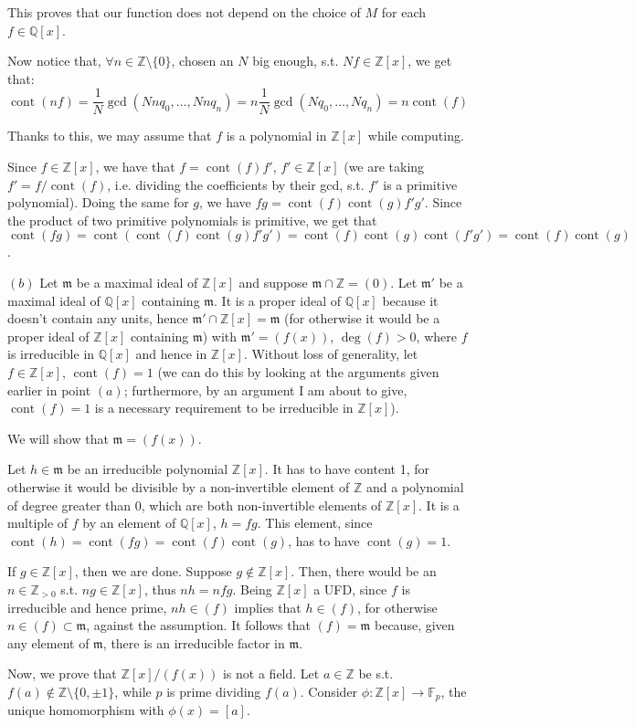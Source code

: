 \documentclass{article}
\newcommand{\numberset}{\mathbb}
\newcommand{\Z}{\numberset{Z}}
\newcommand{\Q}{\numberset{Q}}
\newcommand{\F}{\numberset{F}}
\newcommand{\mi}{\mathfrak{m}}
\DeclareMathOperator{\cont}{cont}
\begin{document}
This proves that our function does not depend on the choice of $M$ for each $f\in\Q[x]$.

Now notice that, $\forall n\in\Z\setminus\{0\}$, chosen an $N$ big enough, s.t. $Nf\in\Z[x]$, we get that:
$$\cont(nf)=\frac{1}{N}\gcd(Nnq_0,\ldots,Nnq_n)=n\frac{1}{N}\gcd(Nq_0,\ldots,Nq_n)=n\cont(f)$$

Thanks to this, we may assume that $f$ is a polynomial in $\Z[x]$ while computing.

Since $f\in\Z[x]$, we have that $f=\cont(f)f'$, $f'\in\Z[x]$ (we are taking $f'=f/\cont(f)$, i.e. dividing the coefficients by their gcd, s.t. $f'$ is a primitive polynomial). Doing the same for $g$, we have $fg=\cont(f)\cont(g)f'g'$. Since the product of two primitive polynomials is primitive, we get that $\cont(fg)=\cont(\cont(f)\cont(g)f'g')=\cont(f)\cont(g)\cont(f'g')=\cont(f)\cont(g)$.

$(b)$ Let $\mi$ be a maximal ideal of $\Z[x]$ and suppose $\mi\cap\Z=(0)$. Let $\mi'$ be a maximal ideal of $\Q[x]$ containing $\mi$. It is a proper ideal of $\Q[x]$ because it doesn't contain any units, hence $\mi'\cap\Z[x]=\mi$ (for otherwise it would be a proper ideal of $\Z[x]$ containing $\mi$) with $\mi'=(f(x))$, $\deg(f)>0$, where $f$ is irreducible in $\Q[x]$ and hence in $\Z[x]$. Without loss of generality, let $f\in\Z[x]$, $\cont(f)=1$ (we can do this by looking at the arguments given earlier in point $(a)$; furthermore, by an argument I am about to give, $\cont(f)=1$ is a necessary requirement to be irreducible in $\Z[x]$).

We will show that $\mi=(f(x))$.

Let $h\in\mi$ be an irreducible polynomial $\Z[x]$. It has to have content 1, for otherwise it would be divisible by a non-invertible element of $\Z$ and a polynomial of degree greater than 0, which are both non-invertible elements of $\Z[x]$. It is a multiple of $f$ by an element of $\Q[x]$, $h=fg$. This element, since $\cont(h)=\cont(fg)=\cont(f)\cont(g)$, has to have $\cont(g)=1$.

If $g\in\Z[x]$, then we are done. Suppose $g\not\in\Z[x]$. Then, there would be an $n\in\Z_{>0}$ s.t. $ng\in\Z[x]$, thus $nh=nfg$. Being $\Z[x]$ a UFD, since $f$ is irreducible and hence prime, $nh\in (f)$ implies that $h\in(f)$, for otherwise $n\in(f)\subset\mi$, against the assumption. It follows that $(f)=\mi$ because, given any element of $\mi$, there is an irreducible factor in $\mi$.

Now, we prove that $\Z[x]/(f(x))$ is not a field. Let $a\in\Z$ be s.t. $f(a)\not\in\Z\setminus\{0,\pm 1\}$, while $p$ is prime dividing $f(a)$. Consider $\phi:\Z[x]\rightarrow\F_{p}$, the unique homomorphism with $\phi(x)=[a]$.
\end{document}
